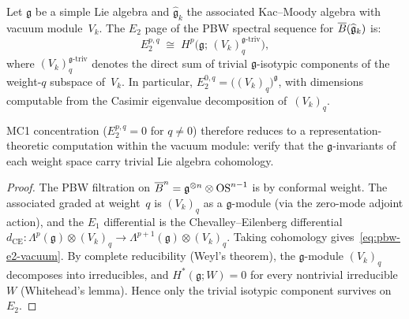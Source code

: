 \begin{proposition}\label{prop:pbw-e2-from-vacuum-module}
Let $\mathfrak{g}$ be a simple Lie algebra and
$\widehat{\mathfrak{g}}_k$ the associated Kac--Moody algebra
with vacuum module~$V_k$.
The $E_2$ page of the PBW spectral sequence for
$\overline{B}(\widehat{\mathfrak{g}}_k)$ is:
\begin{equation}\label{eq:pbw-e2-vacuum}
E_2^{p,q}
\;\cong\;
H^p\!\bigl(\mathfrak{g};\,
(V_k)_q^{\mathfrak{g}\text{-}\mathrm{triv}}\bigr),
\end{equation}
where $(V_k)_q^{\mathfrak{g}\text{-}\mathrm{triv}}$
denotes the direct sum of trivial $\mathfrak{g}$-isotypic
components of the weight-$q$ subspace of~$V_k$.
In particular, $E_2^{0,q} =
\bigl((V_k)_q\bigr)^{\mathfrak{g}}$, with dimensions
computable from the Casimir eigenvalue decomposition
of~$(V_k)_q$.

MC1 concentration ($E_2^{p,q} = 0$ for $q \neq 0$) therefore
reduces to a representation-theoretic computation within the
vacuum module: verify that the $\mathfrak{g}$-invariants of each
weight space carry trivial Lie algebra cohomology.
\end{proposition}

\begin{proof}
The PBW filtration on
$\overline{B}^n = \mathfrak{g}^{\otimes n} \otimes \mathrm{OS}^{n-1}$
is by conformal weight.  The associated graded at weight~$q$ is
$(V_k)_q$ as a $\mathfrak{g}$-module (via the zero-mode adjoint
action), and the $E_1$ differential is the Chevalley--Eilenberg
differential $d_{\mathrm{CE}} \colon
\Lambda^p(\mathfrak{g}) \otimes (V_k)_q \to
\Lambda^{p+1}(\mathfrak{g}) \otimes (V_k)_q$.
Taking cohomology gives~\eqref{eq:pbw-e2-vacuum}.
By complete reducibility (Weyl's theorem), the $\mathfrak{g}$-module
$(V_k)_q$ decomposes into irreducibles, and
$H^*(\mathfrak{g}; W) = 0$ for every nontrivial irreducible~$W$
(Whitehead's lemma).  Hence only the trivial isotypic component
survives on~$E_2$.
\end{proof}

